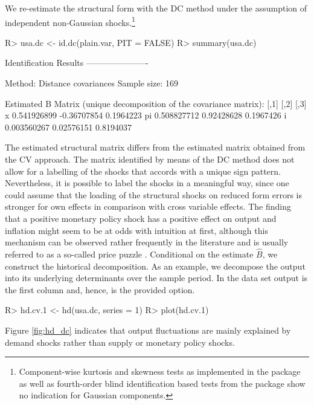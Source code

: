 \documentclass[nojss]{jss}\usepackage[]{graphicx}\usepackage[]{color}
\begin{document}
We re-estimate the structural form with the DC method under the assumption of independent non-Gaussian shocks.\footnote{Component-wise kurtosis and skewness tests as implemented in the package  \citep{normtest} as well as fourth-order blind identification based tests from the package  \citep{ICtest} show no indication for Gaussian components.}
\begin{CodeChunk}
\begin{CodeInput}
R> usa.dc <- id.dc(plain.var, PIT = FALSE)
R> summary(usa.dc)
\end{CodeInput}
\begin{CodeOutput}
Identification Results
----------------------

Method: Distance covariances
Sample size: 169

Estimated B Matrix (unique decomposition of the covariance matrix):
          [,1]        [,2]      [,3]
x  0.541926899 -0.36707854 0.1964223
pi 0.508827712  0.92428628 0.1967426
i  0.003560267  0.02576151 0.8194037
\end{CodeOutput}
\end{CodeChunk}
The estimated structural matrix differs from the estimated matrix obtained from the CV approach. The matrix identified by means of the DC method does not allow for a labelling of the shocks that accords with a unique sign pattern. Nevertheless, it is possible to label the shocks in a meaningful way, since one could assume that the loading of the structural shocks on reduced form errors is stronger for own effects in comparison with cross variable effects. The finding that a positive monetary policy shock has a positive effect on output and inflation might seem to be at odds with intuition at first, although this mechanism can be observed rather frequently in the literature \citep[e.g.,][]{LUTKEPOHL20172} and is usually referred to as a so-called price puzzle \citep{E1992}. Conditional on the estimate $\widehat{B}$, we construct the historical decomposition. As an example, we decompose the output into its underlying determinants over the sample period. In the data set output is the first column and, hence,  is the provided option.
\begin{CodeChunk}
\begin{CodeInput}
R> hd.cv.1 <- hd(usa.dc, series = 1)
R> plot(hd.cv.1)
\end{CodeInput}
\end{CodeChunk}
Figure \ref{fig:hd_dc} indicates that output fluctuations are mainly explained by demand shocks rather than supply or monetary policy shocks.
\end{document}

